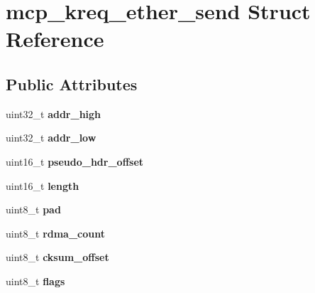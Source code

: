 \hypertarget{structmcp__kreq__ether__send}{
\section{mcp\_\-kreq\_\-ether\_\-send Struct Reference}
\label{structmcp__kreq__ether__send}
}
\subsection*{Public Attributes}
\begin{DoxyCompactItemize}
\item 
\hypertarget{structmcp__kreq__ether__send_acb01fd602f6fa21ae0bb11c785cfad31}{
uint32\_\-t {\bfseries addr\_\-high}}
\label{structmcp__kreq__ether__send_acb01fd602f6fa21ae0bb11c785cfad31}

\item 
\hypertarget{structmcp__kreq__ether__send_a446caa2c973a9c144afe0134dffc2d35}{
uint32\_\-t {\bfseries addr\_\-low}}
\label{structmcp__kreq__ether__send_a446caa2c973a9c144afe0134dffc2d35}

\item 
\hypertarget{structmcp__kreq__ether__send_ab6ed1d915430b7393bf29bbac49512c9}{
uint16\_\-t {\bfseries pseudo\_\-hdr\_\-offset}}
\label{structmcp__kreq__ether__send_ab6ed1d915430b7393bf29bbac49512c9}

\item 
\hypertarget{structmcp__kreq__ether__send_af0b83e7bdb5f99774ca1a9fbae90632d}{
uint16\_\-t {\bfseries length}}
\label{structmcp__kreq__ether__send_af0b83e7bdb5f99774ca1a9fbae90632d}

\item 
\hypertarget{structmcp__kreq__ether__send_a36a91beed489dc67a89d27114f1a8265}{
uint8\_\-t {\bfseries pad}}
\label{structmcp__kreq__ether__send_a36a91beed489dc67a89d27114f1a8265}

\item 
\hypertarget{structmcp__kreq__ether__send_ad25ead24cf706195fdb3d01daea5d84c}{
uint8\_\-t {\bfseries rdma\_\-count}}
\label{structmcp__kreq__ether__send_ad25ead24cf706195fdb3d01daea5d84c}

\item 
\hypertarget{structmcp__kreq__ether__send_a2d62798f0fe399ce05e8bb7135e4078e}{
uint8\_\-t {\bfseries cksum\_\-offset}}
\label{structmcp__kreq__ether__send_a2d62798f0fe399ce05e8bb7135e4078e}

\item 
\hypertarget{structmcp__kreq__ether__send_a8c6beeae46208b37f4d134b003614955}{
uint8\_\-t {\bfseries flags}}
\label{structmcp__kreq__ether__send_a8c6beeae46208b37f4d134b003614955}

\end{DoxyCompactItemize}


